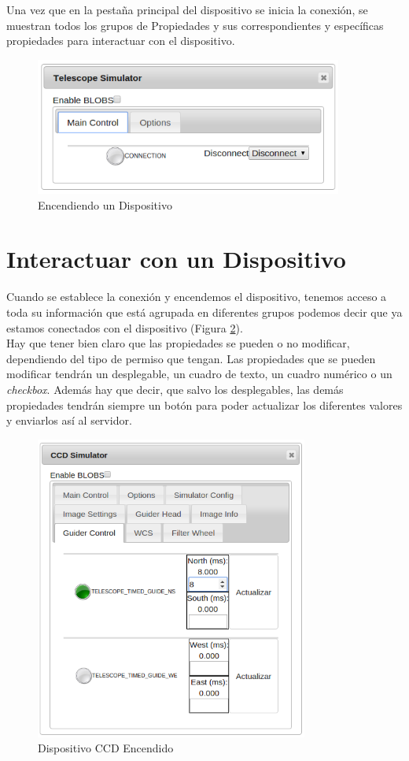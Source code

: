 Una vez que en la pestaña principal del dispositivo se inicia la conexión, se muestran todos los grupos de Propiedades y sus correspondientes y específicas propiedades para interactuar con el dispositivo.
\begin{figure}[htb]
\centering
\includegraphics[width=0.9\textwidth]{./imagenes/capturaEncendiendo}
\caption{Encendiendo un Dispositivo} \label{fig:encendiendoDispositivo}
\end{figure}

\section{Interactuar con un Dispositivo}
Cuando se establece la conexión y encendemos el dispositivo, tenemos acceso a toda su información  que está agrupada en diferentes grupos podemos decir que ya estamos conectados con el dispositivo (Figura \ref{fig:capturaDispositivo}).\\

Hay que tener bien claro que las propiedades se pueden o no modificar, dependiendo del tipo de permiso que tengan. Las propiedades que se pueden modificar tendrán un desplegable, un cuadro de texto, un cuadro numérico o un \textit{checkbox}. Además hay que decir, que salvo los desplegables, las demás propiedades tendrán siempre un botón para poder actualizar los diferentes valores y enviarlos así al servidor.
\begin{figure}[htb]
\centering
\includegraphics[width=0.8\textwidth]{./imagenes/capturaDispositivo}
\caption{Dispositivo CCD Encendido} \label{fig:capturaDispositivo}
\end{figure}

